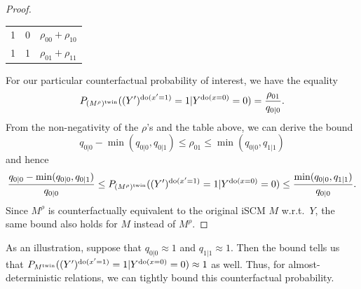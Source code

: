 \begin{proof}
\begin{center}
\begin{tabular}{ccl}
    1   & 0   & $\rho_{00} + \rho_{10}$ \\ %
    1   & 1   & $\rho_{01} + \rho_{11}$ \\ %
  \end{tabular}\end{center}
For our particular counterfactual probability of interest, we have the equality
  $$P_{(M^{\rho})^{\mathrm{twin}}}((Y')^{\operatorname{do}(x'=1)} = 1 | Y^{\operatorname{do}(x=0)}=0) = \frac{\rho_{01}}{q_{0|0}}.$$
From the non-negativity of the $\rho$'s and the table above, we can derive the bound
$$q_{0|0} - \min(q_{0|0},q_{0|1}) \le \rho_{01} \le \min(q_{0|0},q_{1|1})$$
and hence
$$\frac{q_{0|0} - \min(q_{0|0},q_{0|1})}{q_{0|0}} \le P_{(M^{\rho})^{\mathrm{twin}}}((Y')^{\operatorname{do}(x'=1)} = 1 | Y^{\operatorname{do}(x=0)}=0) \le \frac{\min(q_{0|0},q_{1|1})}{q_{0|0}}.$$
Since $M^\rho$ is counterfactually equivalent to the original iSCM $M$ w.r.t.\ $Y$, the same bound also holds for $M$ instead of $M^\rho$.
\end{proof}
As an illustration, suppose that $q_{0|0} \approx 1$ and $q_{1|1} \approx 1$.
Then the bound tells us that $P_{M^{\mathrm{twin}}}((Y')^{\operatorname{do}(x'=1)} = 1 | Y^{\operatorname{do}(x=0)}=0) \approx 1$ as well.
Thus, for almost-deterministic relations, we can tightly bound this counterfactual probability.

